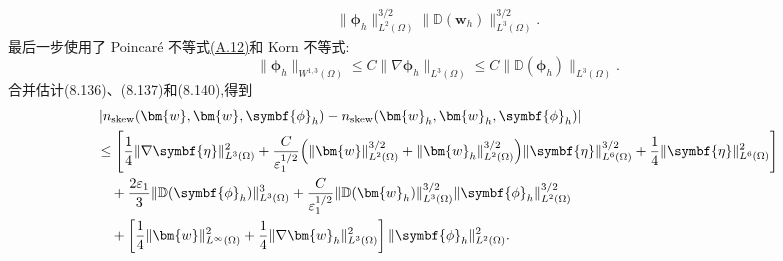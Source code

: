 \begin{note}[自然正则性下且 $\nu_0(\delta)=0$ 的情形]
\begin{equation}
\begin{aligned}
 \|\symbf{\phi}_h\|_{L^2(\Omega)}^{3/2}
 \|\mathbb{D}(\bm{w}_h)\|_{L^3(\Omega)}^{3/2}.
\end{aligned}
\end{equation}
最后一步使用了 Poincaré 不等式\hyperref[eq:appendix-a-12]{(A.12)}和 Korn 不等式:
\[
\|\symbf{\phi}_h\|_{W^{1,3}(\Omega)}
\le C\|\nabla\symbf{\phi}_h\|_{L^3(\Omega)}
\le C\|\mathbb{D}(\symbf{\phi}_h)\|_{L^3(\Omega)}.
\]
合并估计(8.136)、(8.137)和(8.140),得到
\begin{equation}\label{eq:smagorinsky-error-convective-combined-zero-viscosity}
\begin{aligned}
&\left|
 n_{\mathrm{skew}}(\bm{w},\bm{w},\symbf{\phi}_h)
 -n_{\mathrm{skew}}(\bm{w}_h,\bm{w}_h,\symbf{\phi}_h)
 \right|\\
&\le\Biggl[
 \frac14\|\nabla\symbf{\eta}\|_{L^3(\Omega)}^2
 +\frac{C}{\varepsilon_1^{1/2}}
   \Bigl(\|\bm{w}\|_{L^2(\Omega)}^{3/2}
       +\|\bm{w}_h\|_{L^2(\Omega)}^{3/2}\Bigr)
   \|\symbf{\eta}\|_{L^6(\Omega)}^{3/2}
 +\frac14\|\symbf{\eta}\|_{L^6(\Omega)}^2
 \Biggr]\\
&\quad+\frac{2\varepsilon_1}{3}
 \|\mathbb{D}(\symbf{\phi}_h)\|_{L^3(\Omega)}^3
 +\frac{C}{\varepsilon_1^{1/2}}
 \|\mathbb{D}(\bm{w}_h)\|_{L^3(\Omega)}^{3/2}
 \|\symbf{\phi}_h\|_{L^2(\Omega)}^{3/2}\\
&\quad+\left[
 \frac14\|\bm{w}\|_{L^\infty(\Omega)}^2
 +\frac14\|\nabla\bm{w}_h\|_{L^3(\Omega)}^2
 \right]\|\symbf{\phi}_h\|_{L^2(\Omega)}^2.
\end{aligned}
\end{equation}


\end{note}
